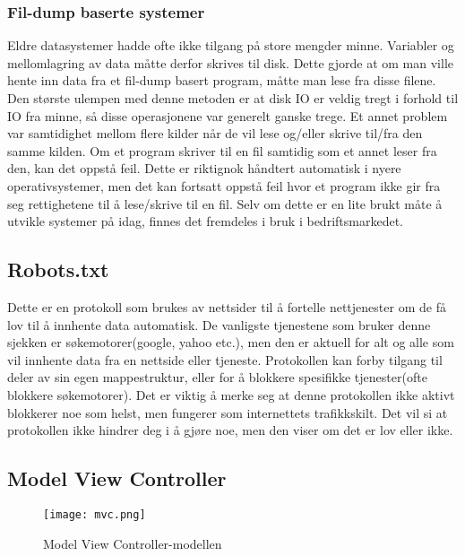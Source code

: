 \documentclass[../main.tex]{subfiles}
\begin{document}
\subsubsection{Fil-dump baserte systemer}

Eldre datasystemer hadde ofte ikke tilgang på store mengder minne. Variabler og mellomlagring av data måtte derfor skrives til disk. Dette gjorde at om man ville hente inn data fra et fil-dump basert program, måtte man lese fra disse filene. Den største ulempen med denne metoden er at disk IO er veldig tregt i forhold til IO fra minne, så disse operasjonene var generelt ganske trege. Et annet problem var samtidighet mellom flere kilder når de vil lese og/eller skrive til/fra den samme kilden. Om et program skriver til en fil samtidig som et annet leser fra den, kan det oppstå feil. Dette er riktignok håndtert automatisk i nyere operativsystemer, men det kan fortsatt oppstå feil hvor et program ikke gir fra seg rettighetene til å lese/skrive til en fil.\newline
Selv om dette er en lite brukt måte å utvikle systemer på idag, finnes det fremdeles i bruk i bedriftsmarkedet.

\subsection{Robots.txt}

Dette er en protokoll som brukes av nettsider til å fortelle nettjenester om de få lov til å innhente data automatisk. De vanligste tjenestene som bruker denne sjekken er søkemotorer(google, yahoo etc.), men den er aktuell for alt og alle som vil innhente data fra en nettside eller tjeneste.\newline
Protokollen kan forby tilgang til deler av sin egen mappestruktur, eller for å blokkere spesifikke tjenester(ofte blokkere søkemotorer). Det er viktig å merke seg at denne protokollen ikke aktivt blokkerer noe som helst, men fungerer som internettets trafikkskilt. Det vil si at protokollen ikke hindrer deg i å gjøre noe, men den viser om det er lov eller ikke.

\subsection{Model View Controller}
\begin{figure}[H]
  \centering
    \texttt{[image: mvc.png]}
   \caption{Model View Controller-modellen}
\end{figure}
\end{document}
